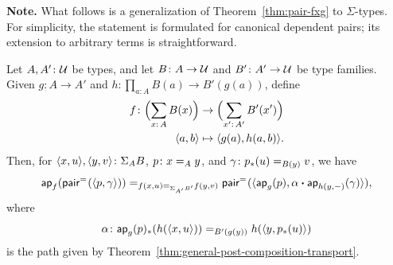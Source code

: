 \textbf{Note.} What follows is a generalization of Theorem~\ref{thm:pair-fxg} to\/ $\Sigma$-types. For simplicity, the statement is formulated for canonical dependent pairs; its extension to arbitrary terms is straightforward.

\begin{thm}\label{thm:pair-dependent-gxh}
    Let\/ $A,A'\colon\univ$ be types, and let\/ $B\colon A\to\univ$ and\/ $B'\colon A'\to\univ$ be type families. Given\/ $g\colon A\to A'$ and\/ $h\colon\prod_{a\colon A}B(a)\to B'(g(a))$, define
    \begin{align*}
        f\colon
            \Bigl(
                \sum_{x\colon A}B(x)
            \Bigr)
            &\to
            \Bigl(
                \sum_{x'\colon A'}B'(x')
            \Bigr)
            \\
        \dep{a,b}&\mapsto\dep{g(a),h(a,b)}.
    \end{align*}
    Then, for\/ $\dep{x,u},\dep{y,v}\colon\Sigma_AB$, $p\colon x\eq{A}y$, and\/ $\gamma\colon p_*(u)\eq{B(y)}v$, we have
    \[
        \mathsf{ap}_f(\mathsf{pair}^{\mathrel{=_{}}}(\langle p,\gamma\rangle))
        \mathrel{=_{f(x,u)\mathrel{=_{\Sigma_{A'}B'}}f(y,v)}}
        \mathsf{pair}^{\mathrel{=_{}}}
            (\langle\mathsf{ap}_g(p),\alpha\mathbin{\boldsymbol{\cdot}}\mathsf{ap}_{h(y,{\mathord-})}(\gamma)\rangle),
    \]
    where
    \[
        \alpha\colon\fun{ap}_g(p)_*
            (h(\dep{x,u}))
            \eq{B'(g(y))}
            h(\dep{y,p_*(u)})
    \]
    is the path given by\/ {\upshape Theorem~\ref{thm:general-post-composition-transport}}.
\end{thm}

